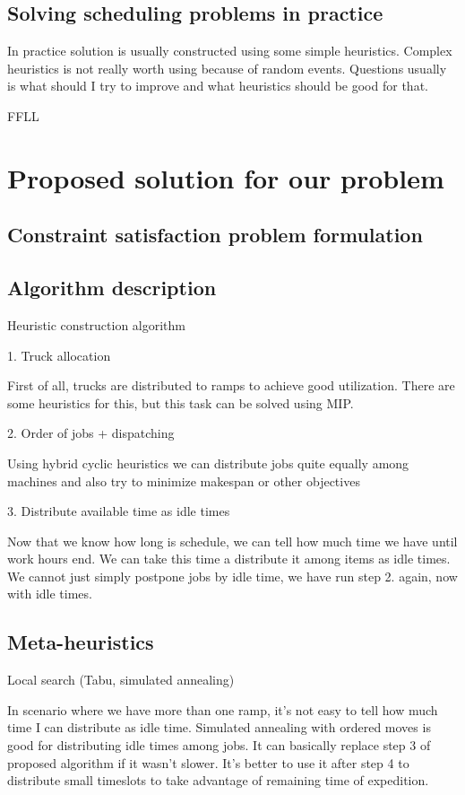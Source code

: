 \documentclass{ctuthesis}
\begin{document}
\section{Solving scheduling problems in practice}
In practice solution is usually constructed using some simple heuristics. Complex heuristics is not really worth using because of random events. Questions usually is what should I try to improve and what heuristics should be good for that. 

FFLL 
\chapter{Proposed solution for our problem}
\section{Constraint satisfaction problem formulation}
\section{Algorithm description}
Heuristic construction algorithm

1. Truck allocation

First of all, trucks are distributed to ramps to achieve good utilization. There are some heuristics for this, but this task can be solved using MIP.

2. Order of jobs + dispatching

Using hybrid cyclic heuristics we can distribute jobs quite equally among machines and also try to minimize makespan or other objectives

3. Distribute available time as idle times

Now that we know how long is schedule, we can tell how much time we have until work hours end. We can take this time a distribute it among items as idle times. We cannot just simply postpone jobs by idle time, we have run step 2. again, now with idle times.

\section{Meta-heuristics}
Local search (Tabu, simulated annealing)

In scenario where we have more than one ramp, it's not easy to tell how much time I can distribute as idle time. Simulated annealing with ordered moves is good for distributing idle times among jobs. It can basically replace step 3 of proposed algorithm if it wasn't slower. It's better to use it after step 4 to distribute small timeslots to take advantage of remaining time of expedition.
\end{document}
